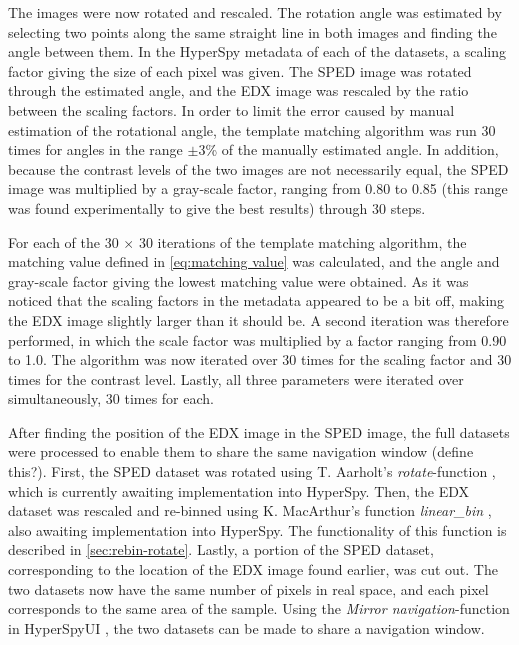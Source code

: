 The images were now rotated and rescaled. The rotation angle was estimated by selecting two points along the same straight line in both images and finding the angle between them. In the HyperSpy metadata of each of the datasets, a scaling factor giving the size of each pixel was given. The SPED image was rotated through the estimated angle, and the EDX image was rescaled by the ratio between the scaling factors. In order to limit the error caused by manual estimation of the rotational angle, the template matching algorithm was run 30 times for angles in the range $\pm3$\% of the manually estimated angle. In addition, because the contrast levels of the two images are not necessarily equal, the SPED image was multiplied by a gray-scale factor, ranging from 0.80 to 0.85 (this range was found experimentally to give the best results) through 30 steps.

For each of the 30 $\times$ 30 iterations of the template matching algorithm, the matching value defined in \cref{eq:matching value} was calculated, and the angle and gray-scale factor giving the lowest matching value were obtained. As it was noticed that the scaling factors in the metadata appeared to be a bit off, making the EDX image slightly larger than it should be. A second iteration was therefore performed, in which the scale factor was multiplied by a factor ranging from 0.90 to 1.0. The algorithm was now iterated over 30 times for the scaling factor and 30 times for the contrast level. Lastly, all three parameters were iterated over simultaneously, 30 times for each. 

After finding the position of the EDX image in the SPED image, the full datasets were processed to enable them to share the same navigation window (define this?). First, the SPED dataset was rotated using T. Aarholt's \textit{rotate}-function \cite{aarholt-rotation}, which is currently awaiting implementation into HyperSpy. Then, the EDX dataset was rescaled and re-binned using K. MacArthur's function \textit{linear\_bin} \cite{kate-binning}, also awaiting implementation into HyperSpy. The functionality of this function is described in \cref{sec:rebin-rotate}. Lastly, a portion of the SPED dataset, corresponding to the location of the EDX image found earlier, was cut out. The two datasets now have the same number of pixels in real space, and each pixel corresponds to the same area of the sample. Using the \textit{Mirror navigation}-function in HyperSpyUI \cite{hyperspyUI}, the two datasets can be made to share a navigation window. 

